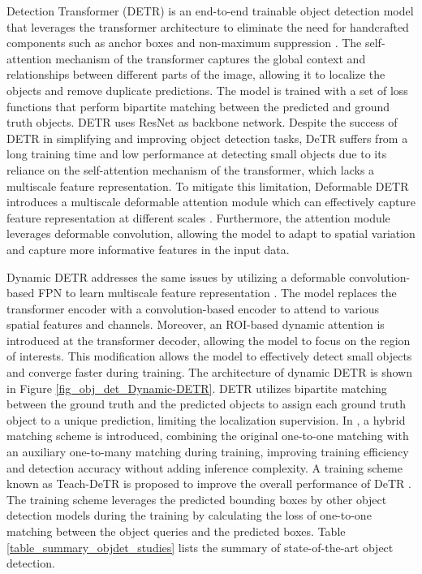 \documentclass[preprint,12pt]{elsarticle}
\begin{document}
Detection Transformer (DETR) is an end-to-end trainable object detection model that leverages the transformer architecture to eliminate the need for handcrafted components such as anchor boxes and non-maximum suppression \citep{carion_end_end_2020}. The self-attention mechanism of the transformer captures the global context and relationships between different parts of the image, allowing it to localize the objects and remove duplicate predictions. The model is trained with a set of loss functions that perform bipartite matching between the predicted and ground truth objects. DETR uses ResNet as backbone network. Despite the success of DETR in simplifying and improving object detection tasks, DeTR suffers from a long training time and low performance at detecting small objects due to its reliance on the self-attention mechanism of the transformer, which lacks a multiscale feature representation. To mitigate this limitation, Deformable DETR introduces a multiscale deformable attention module which can effectively capture feature representation at different scales \citep{zhu_deformable_2020}. Furthermore, the attention module leverages deformable convolution, allowing the model to adapt to spatial variation and capture more informative features in the input data. 

Dynamic DETR addresses the same issues by utilizing a deformable convolution-based FPN to learn multiscale feature representation \citep{dai_dynamic_2021}. The model replaces the transformer encoder with a convolution-based encoder to attend to various spatial features and channels. Moreover, an ROI-based dynamic attention is introduced at the transformer decoder, allowing the model to focus on the region of interests. This modification allows the model to effectively detect small objects and converge faster during training. The architecture of dynamic DETR is shown in Figure \ref{fig_obj_det_Dynamic-DETR}. DETR utilizes bipartite matching between the ground truth and the predicted objects to assign each ground truth object to a unique prediction, limiting the localization supervision. In \citep{jia_detrs_2023}, a hybrid matching scheme is introduced, combining the original one-to-one matching with an auxiliary one-to-many matching during training, improving training efficiency and detection accuracy without adding inference complexity. A training scheme known as Teach-DeTR is proposed to improve the overall performance of DeTR \citep{huang_teach-detr_2023}. The training scheme leverages the predicted bounding boxes by other object detection models during the training by calculating the loss of one-to-one matching between the object queries and the predicted boxes. Table \ref{table_summary_objdet_studies} lists the summary of state-of-the-art object detection.
\end{document}
